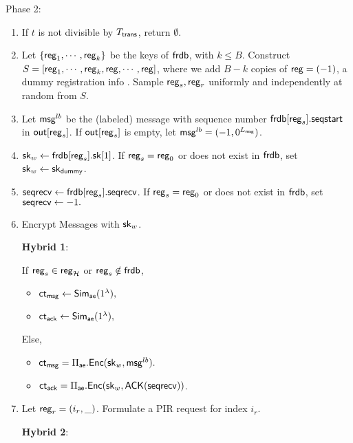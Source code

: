 Phase 2:
\begin{enumerate}
    \item If $t$ is not divisible by $T_{\mathsf{trans}}$, return $\emptyset$.
    \item Let $\{\mathsf{reg}_1, \cdots, \mathsf{reg}_k\}$ be the keys of $\mathsf{frdb}$, with $k\leq B$. Construct $S = [\mathsf{reg}_1,\cdots, \mathsf{reg}_k, \mathsf{reg}, \cdots, \mathsf{reg}]$, where we add $B - k$ copies of $\mathsf{reg} = (-1)$, a dummy registration info . Sample $\mathsf{reg}_s, \mathsf{reg}_r$ uniformly and independently at random from $S$. 
    \item Let $\mathsf{msg}^{lb}$ be the (labeled) message with sequence number $\mathsf{frdb}[\mathsf{reg}_s].\mathsf{seqstart}$ in $\mathsf{out}[\mathsf{reg}_s]$. If $\mathsf{out}[\mathsf{reg}_s]$ is empty, let $\mathsf{msg}^{lb} = (-1, 0^{L_{\mathsf{msg}}})$.
    \item ${\mathsf{sk}}_w \leftarrow \mathsf{frdb}[\mathsf{reg}_s].{\mathsf{sk}}[1]$. If $\mathsf{reg}_s = \mathsf{reg}_0$ or does not exist in $\mathsf{frdb}$, set ${\mathsf{sk}}_w \leftarrow {\ensuremath{\mathsf{sk}}}_{\mathsf{dummy}}$.
    \item $\mathsf{seqrecv} \leftarrow \mathsf{frdb}[\mathsf{reg}_s].\mathsf{seqrecv}$. If $\mathsf{reg}_s = \mathsf{reg}_0$ or does not exist in $\mathsf{frdb}$, set $\mathsf{seqrecv} \leftarrow -1.$
    \item Encrypt Messages with ${\mathsf{sk}}_w$.

    \begin{siderule}
        { 
        \textbf{Hybrid 1}:
        
        If $\mathsf{reg}_s \in \mathsf{reg}_{\mathcal{H}}$ or $\mathsf{reg}_s \notin \mathsf{frdb}$,
        \begin{itemize}
            \item $\mathsf{ct}_{\mathsf{msg}} \leftarrow \mathsf{Sim}_{\mathsf{ae}}(1^{\lambda}),$
            \item $\mathsf{ct}_{\mathsf{ack}} \leftarrow \mathsf{Sim}_{\mathsf{ae}}(1^{\lambda}),$
        \end{itemize}
        Else, 
        }
    \end{siderule}
    
    
    \begin{itemize}
        \item $\mathsf{ct}_{\mathsf{msg}} = \Pi_{\mathsf{ae}}.\mathsf{Enc}({\mathsf{sk}}_w, \mathsf{msg}^{lb}).$
        \item $\mathsf{ct}_{\mathsf{ack}} = \Pi_{\mathsf{ae}}.\mathsf{Enc}({\mathsf{sk}}_w, \mathsf{ACK}(\mathsf{seqrecv}))$.
    \end{itemize}
    \item Let $\mathsf{reg}_r = (i_r, \_)$. Formulate a PIR request for index $i_r$. 

     \begin{siderule}
     {
     
          
     \textbf{Hybrid 2}:
         
}
\end{siderule}
\end{enumerate}
